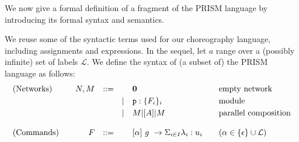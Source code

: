 We now give a formal definition of a fragment of the PRISM language by
introducing its formal syntax and semantics.

 We reuse some of the syntactic terms used for our
choreography language, including assignments and expressions. In the
sequel, let $a$ range over a (possibly infinite) set of labels
$\mathcal L$. We define the syntax of (a subset of) the PRISM language
as follows:
\begin{displaymath}
  \begin{array}{lrlll@{\qquad}l}
    \text{(Networks)}  \quad
    & N, M  & ::=  &      & \CEnd & \text{empty network}\\[1mm]
    &       &      & \mid & \role{p}:\{F_i\}_i & \text{module}\\[1mm]
    &       &      & \mid & M \ppp A M & \text{parallel composition}\\
    \\
    \text{(Commands)}  \quad
    & F     & ::=  &      & \command \alpha g\lambda u
                                  & \text{} (\alpha\in\{\epsilon\}\cup\mathcal L) \\
  \end{array}
\end{displaymath}
